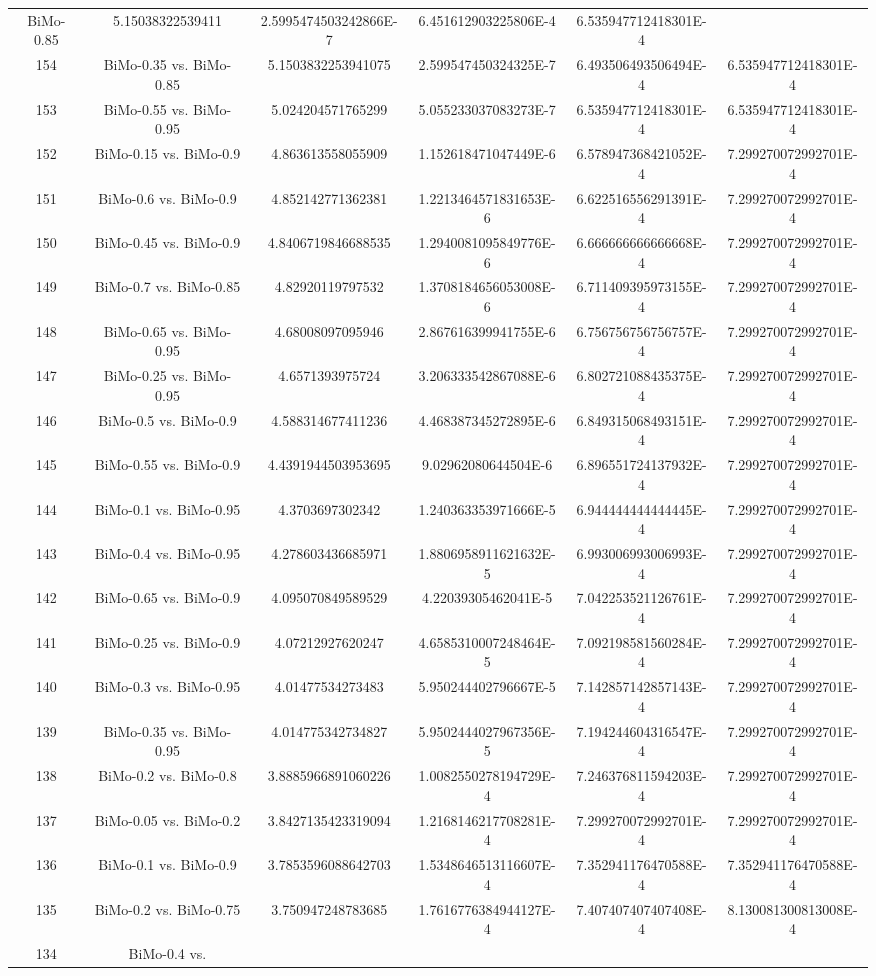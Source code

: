 \documentclass[a4paper,10pt]{article}
\begin{document}
\begin{landscape}
\begin{table}[!htp]
\begin{tabular}{cccccc}
BiMo-0.85&5.15038322539411&2.5995474503242866E-7&6.451612903225806E-4&6.535947712418301E-4\\154&BiMo-0.35 vs. BiMo-0.85&5.1503832253941075&2.599547450324325E-7&6.493506493506494E-4&6.535947712418301E-4\\153&BiMo-0.55 vs. BiMo-0.95&5.024204571765299&5.055233037083273E-7&6.535947712418301E-4&6.535947712418301E-4\\152&BiMo-0.15 vs. BiMo-0.9&4.863613558055909&1.152618471047449E-6&6.578947368421052E-4&7.299270072992701E-4\\151&BiMo-0.6 vs. BiMo-0.9&4.852142771362381&1.2213464571831653E-6&6.622516556291391E-4&7.299270072992701E-4\\150&BiMo-0.45 vs. BiMo-0.9&4.8406719846688535&1.2940081095849776E-6&6.666666666666668E-4&7.299270072992701E-4\\149&BiMo-0.7 vs. BiMo-0.85&4.82920119797532&1.3708184656053008E-6&6.711409395973155E-4&7.299270072992701E-4\\148&BiMo-0.65 vs. BiMo-0.95&4.68008097095946&2.867616399941755E-6&6.756756756756757E-4&7.299270072992701E-4\\147&BiMo-0.25 vs. BiMo-0.95&4.6571393975724&3.206333542867088E-6&6.802721088435375E-4&7.299270072992701E-4\\146&BiMo-0.5 vs. BiMo-0.9&4.588314677411236&4.468387345272895E-6&6.849315068493151E-4&7.299270072992701E-4\\145&BiMo-0.55 vs. BiMo-0.9&4.4391944503953695&9.02962080644504E-6&6.896551724137932E-4&7.299270072992701E-4\\144&BiMo-0.1 vs. BiMo-0.95&4.3703697302342&1.240363353971666E-5&6.944444444444445E-4&7.299270072992701E-4\\143&BiMo-0.4 vs. BiMo-0.95&4.278603436685971&1.8806958911621632E-5&6.993006993006993E-4&7.299270072992701E-4\\142&BiMo-0.65 vs. BiMo-0.9&4.095070849589529&4.22039305462041E-5&7.042253521126761E-4&7.299270072992701E-4\\141&BiMo-0.25 vs. BiMo-0.9&4.07212927620247&4.6585310007248464E-5&7.092198581560284E-4&7.299270072992701E-4\\140&BiMo-0.3 vs. BiMo-0.95&4.01477534273483&5.950244402796667E-5&7.142857142857143E-4&7.299270072992701E-4\\139&BiMo-0.35 vs. BiMo-0.95&4.014775342734827&5.9502444027967356E-5&7.194244604316547E-4&7.299270072992701E-4\\138&BiMo-0.2 vs. BiMo-0.8&3.8885966891060226&1.0082550278194729E-4&7.246376811594203E-4&7.299270072992701E-4\\137&BiMo-0.05 vs. BiMo-0.2&3.8427135423319094&1.2168146217708281E-4&7.299270072992701E-4&7.299270072992701E-4\\136&BiMo-0.1 vs. BiMo-0.9&3.7853596088642703&1.5348646513116607E-4&7.352941176470588E-4&7.352941176470588E-4\\135&BiMo-0.2 vs. BiMo-0.75&3.750947248783685&1.7616776384944127E-4&7.407407407407408E-4&8.130081300813008E-4\\134&BiMo-0.4 vs. 
\end{tabular}
\end{table}
\end{landscape}
\end{document}
